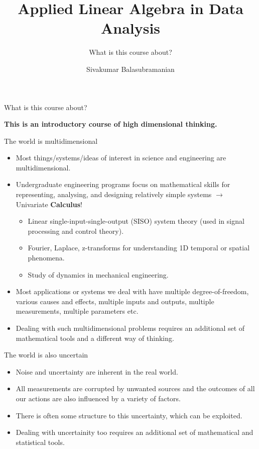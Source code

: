 \documentclass[aspectratio=169]{beamer}
\title{Applied Linear Algebra in Data Analysis}
\subtitle{What is this course about?}
\author{Sivakumar Balasubramanian}
\institute[Christian Medical College] %
{
  \inst{}%
  Department of Bioengineering\\
  Christian Medical College, Bagayam\\
  Vellore 632002
}
\date{}
\let\olditem\item
\renewcommand{\item}{\setlength{\itemsep}{\fill}\olditem}
\begin{document}
\begin{frame}
  \titlepage
\end{frame}


\begin{frame}[t]{What is this course about?}
  \vspace{2cm}
  \begin{center}
    \textcolor{myred}{\huge \textbf{This is an introductory course of high dimensional thinking.}}
  \end{center}
\end{frame}


\begin{frame}[t]{The world is multidimensional}
\begin{itemize}
  \item Most things/systems/ideas of interest in science and engineering are multidimensional.
  \item Undergraduate engineering programs focus on mathematical skills for representing, analysing, and designing relatively simple systems $\longrightarrow$ Univariate \textbf{Calculus}!
  \begin{itemize}
    \item Linear single-input-single-output (SISO) system theory (used in signal processing and control theory).
    \item Fourier, Laplace, z-transforms for understanding 1D temporal or spatial phenomena.
    \item Study of dynamics in mechanical engineering.
  \end{itemize}
  \item Most applications or systems we deal with have multiple degree-of-freedom, various causes and effects, multiple inputs and outputs, multiple measurements, multiple parameters etc.
  \item Dealing with such multidimensional problems requires an additional set of mathematical tools and a different way of thinking. 
\end{itemize}
\end{frame}


\begin{frame}{The world is also uncertain}
\begin{itemize}
  \item Noise and uncertainty are inherent in the real world.
  \item All measurements are corrupted by unwanted sources and the outcomes of all our actions are also influenced by a variety of factors.
  \item There is often some structure to this uncertainty, which can be exploited.
  \item Dealing with uncertainity too requires an additional set of mathematical and statistical tools.
\end{itemize}
\end{frame}
\end{document}
